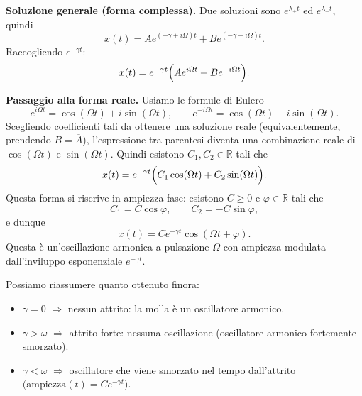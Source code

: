 \medskip
\textbf{Soluzione generale (forma complessa).}
Due soluzioni sono \(e^{\lambda_+ t}\) ed \(e^{\lambda_- t}\), quindi
\[
x(t)=A e^{(-\gamma+i\Omega)t}+B e^{(-\gamma-i\Omega)t}.
\]
Raccogliendo \(e^{-\gamma t}\):
\[
x(t)=e^{-\gamma t}\Bigl(A e^{i\Omega t}+B e^{-i\Omega t}\Bigr).
\]

\medskip
\textbf{Passaggio alla forma reale.}
Usiamo le formule di Eulero
\[
e^{i\Omega t}=\cos(\Omega t)+i\sin(\Omega t),\qquad
e^{-i\Omega t}=\cos(\Omega t)-i\sin(\Omega t).
\]
Scegliendo coefficienti tali da ottenere una soluzione reale (equivalentemente, prendendo \(B=\overline{A}\)), l'espressione tra parentesi diventa una combinazione reale di \(\cos(\Omega t)\) e \(\sin(\Omega t)\). Quindi esistono \(C_1,C_2\in\mathbb{R}\) tali che
\[
x(t)=e^{-\gamma t}\Bigl(C_1\cos(\Omega t)+C_2\sin(\Omega t)\Bigr).
\]
Questa forma si riscrive in ampiezza-fase: esistono \(C\ge 0\) e \(\varphi\in\mathbb{R}\) tali che
\[
C_1=C\cos\varphi,\qquad C_2=-C\sin\varphi,
\]
e dunque
\[
x(t)=C e^{-\gamma t}\cos(\Omega t+\varphi).
\]
Questa è un'oscillazione armonica a pulsazione \(\Omega\) con ampiezza modulata dall'inviluppo esponenziale \(e^{-\gamma t}\).

\begin{center}
\end{center}
Possiamo riassumere quanto ottenuto finora:
\begin{itemize}
\item \(\gamma=0\) \(\Rightarrow\) nessun attrito: la molla è un oscillatore armonico.

\item \(\gamma>\omega\) \(\Rightarrow\) attrito forte: nessuna oscillazione (oscillatore armonico fortemente smorzato).

\item \(\gamma<\omega\) \(\Rightarrow\) oscillatore che viene smorzato nel tempo dall'attrito \(\bigl(\text{ampiezza}(t)=C e^{-\gamma t}\bigr)\).
\end{itemize}


